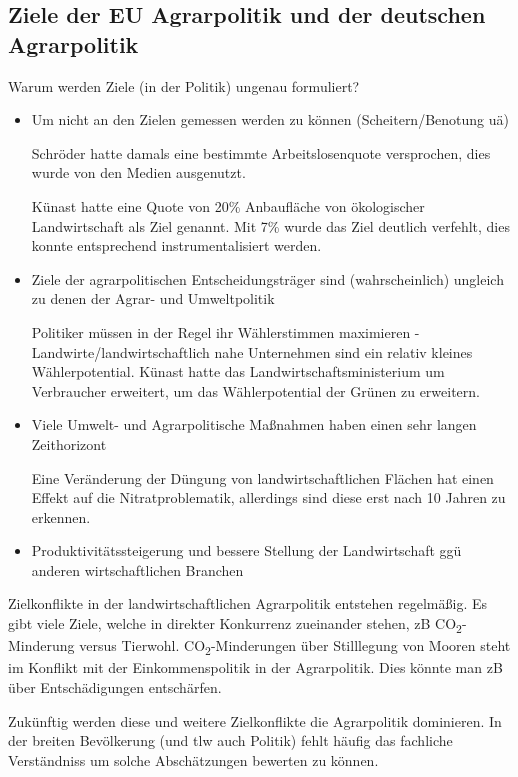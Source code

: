 \documentclass[11pt]{scrartcl}
\begin{document}
\subsection{Ziele der \ac{EU} Agrarpolitik und der deutschen Agrarpolitik}
Warum werden Ziele (in der Politik) ungenau formuliert?
\begin{itemize}
	\item Um nicht an den Zielen gemessen werden zu können (Scheitern/Benotung uä)

		Schröder hatte damals eine bestimmte Arbeitslosenquote versprochen, dies wurde von den Medien ausgenutzt.

		Künast hatte eine Quote von 20\% Anbaufläche von ökologischer Landwirtschaft als Ziel genannt.
		Mit 7\% wurde das Ziel deutlich verfehlt, dies konnte entsprechend instrumentalisiert werden.

	\item Ziele der agrarpolitischen Entscheidungsträger sind (wahrscheinlich) ungleich zu denen der Agrar- und Umweltpolitik

		Politiker müssen in der Regel ihr Wählerstimmen maximieren - Landwirte/landwirtschaftlich nahe Unternehmen sind ein relativ kleines Wählerpotential.
		Künast hatte das Landwirtschaftsministerium um Verbraucher erweitert, um das Wählerpotential der Grünen zu erweitern.

	\item Viele Umwelt- und Agrarpolitische Maßnahmen haben einen sehr langen Zeithorizont

		Eine Veränderung der Düngung von landwirtschaftlichen Flächen hat einen Effekt auf die Nitratproblematik, allerdings sind diese erst nach 10 Jahren zu erkennen.

	\item Produktivitätssteigerung und bessere Stellung der Landwirtschaft ggü anderen wirtschaftlichen Branchen
\end{itemize}

Zielkonflikte in der landwirtschaftlichen Agrarpolitik entstehen regelmäßig.
Es gibt viele Ziele, welche in direkter Konkurrenz zueinander stehen, zB CO\textsubscript{2}-Minderung versus Tierwohl.
CO\textsubscript{2}-Minderungen über Stilllegung von Mooren steht im Konflikt mit der Einkommenspolitik in der Agrarpolitik. Dies könnte man zB über Entschädigungen entschärfen.

Zukünftig werden diese und weitere Zielkonflikte die Agrarpolitik dominieren.
In der breiten Bevölkerung (und tlw auch Politik) fehlt häufig das fachliche Verständniss um solche Abschätzungen bewerten zu können.
\end{document}
